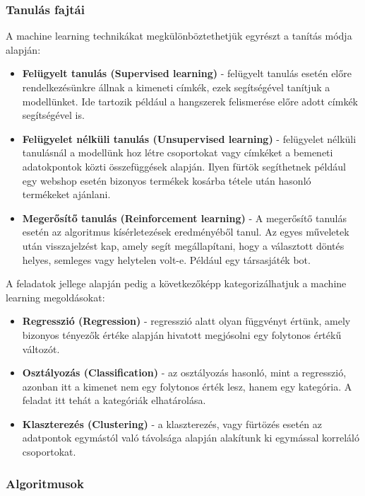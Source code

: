 \subsubsection{Tanulás fajtái}

A machine learning technikákat megkülönböztethetjük egyrészt a tanítás módja alapján:
\begin{itemize}
\item \textbf{Felügyelt tanulás (Supervised learning)} - felügyelt tanulás esetén előre rendelkezésünkre állnak a kimeneti címkék, ezek segítségével tanítjuk a modellünket. Ide tartozik például a hangszerek felismerése előre adott címkék segítségével is.
\item \textbf{Felügyelet nélküli tanulás (Unsupervised learning)} - felügyelet nélküli tanulásnál a modellünk hoz létre csoportokat vagy címkéket a bemeneti adatokpontok közti összefüggések alapján. Ilyen fürtök segíthetnek például egy webshop esetén bizonyos termékek kosárba tétele után hasonló termékeket ajánlani.
\item\textbf{Megerősítő tanulás (Reinforcement learning)} - A megerősítő tanulás esetén az algoritmus kísérletezések eredményéből tanul. Az egyes műveletek után visszajelzést kap, amely segít megállapítani, hogy a választott döntés helyes, semleges vagy helytelen volt-e. Például egy társasjáték bot. \cite{azure}
\end{itemize}

A feladatok jellege alapján pedig a következőképp kategorizálhatjuk a machine learning megoldásokat:

\begin{itemize}
\item \textbf{Regresszió (Regression)} - regresszió alatt olyan függvényt értünk, amely bizonyos tényezők értéke alapján hivatott megjósolni egy folytonos értékű változót. 
\item \textbf{Osztályozás (Classification)} - az osztályozás hasonló, mint a regresszió, azonban itt a kimenet nem egy folytonos érték lesz, hanem egy kategória. A feladat itt tehát a kategóriák elhatárolása.
\item \textbf{Klaszterezés (Clustering)} - a klaszterezés, vagy fürtözés esetén az adatpontok egymástól való távolsága alapján alakítunk ki egymással korreláló csoportokat. \cite{deeplearningbook}
\end{itemize}

\subsubsection{Algoritmusok}

